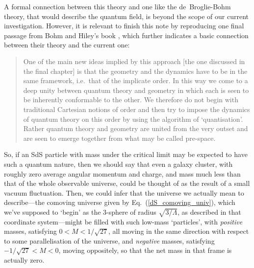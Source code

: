 A formal connection between this theory and one like the de~Broglie-Bohm theory, that would describe the quantum field, is beyond the scope of our current investigation. However, it is relevant to finish this note by reproducing one final passage from Bohm and Hiley's book \cite{Bohm1993}, which further indicates a basic connection between their theory and the current one: 
\begin{quotation}
One of the main new ideas implied by this approach [the one discussed in the final chapter] is that the geometry and the dynamics have to be in the same framework, i.e.~that of the implicate order. In this way we come to a deep unity between quantum theory and geometry in which each is seen to be inherently conformable to the other. We therefore do not begin with traditional Cartesian notions of order and then try to impose the dynamics of quantum theory on this order by using the algorithm of `quantisation'. Rather quantum theory and geometry are united from the very outset and are seen to emerge together from what may be called pre-space.
\end{quotation}

So, if an SdS particle with mass under the critical limit may be expected to have such a quantum nature, then we should say that even a galaxy cluster, with roughly zero average angular momentum and charge, and mass much less than that of the whole observable universe, could be thought of as the result of a small vacuum fluctuation. Then, we could infer that the universe we actually mean to describe---the comoving universe given by Eq.~(\ref{dS_comoving_univ}), which we've supposed to `begin' as the 3-sphere of radius $\sqrt{3/\Lambda}$, as described in that coordinate system---might be filled with such low-mass `particles', with \textit{positive} masses, satisfying $0<M<1/\sqrt{27}$, all moving in the same direction with respect to some parallelisation of the universe, and \textit{negative} masses, satisfying $-1/\sqrt{27}<M<0$, moving oppositely, so that the net mass in that frame is actually zero. 

